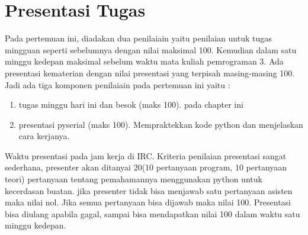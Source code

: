 \section{Presentasi Tugas}
Pada pertemuan ini, diadakan dua penilaiain yaitu penilaian untuk tugas mingguan seperti sebelumnya dengan nilai maksimal 100. Kemudian dalam satu minggu kedepan maksimal sebelum waktu mata kuliah pemrograman 3. Ada presentasi kematerian dengan nilai presentasi yang terpisah masing-masing 100. Jadi ada tiga komponen penilaiain pada pertemuan ini yaitu :
\begin{enumerate}
	\item tugas minggu hari ini dan besok (maks 100). pada chapter ini
	\item presentasi pyserial (maks 100). Mempraktekkan kode python dan menjelaskan cara kerjanya.
\end{enumerate}
Waktu presentasi pada jam kerja di IRC. Kriteria penilaian presentasi sangat sederhana, presenter akan ditanyai 20(10 pertanyaan program, 10 pertanyaan teori) pertanyaan tentang pemahamannya menggunakan python untuk kecerdasan buatan. jika presenter tidak bisa menjawab satu pertanyaan asisten maka nilai nol. Jika semua pertanyaan bisa dijawab maka nilai 100. Presentasi bisa diulang apabila gagal, sampai bisa mendapatkan nilai 100 dalam waktu satu minggu kedepan.




